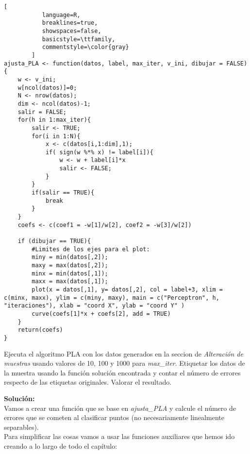 \documentclass[11pt,fleqn]{book} %
\begin{document}
\begin{lstlisting}[
           language=R,
           breaklines=true,
           showspaces=false,
           basicstyle=\ttfamily,
           commentstyle=\color{gray}
        ]
ajusta_PLA <- function(datos, label, max_iter, v_ini, dibujar = FALSE){
    w <- v_ini;
    w[ncol(datos)]=0;
    N <- nrow(datos);
    dim <- ncol(datos)-1;
    salir = FALSE;
    for(h in 1:max_iter){
        salir <- TRUE;
        for(i in 1:N){
            x <- c(datos[i,1:dim],1);
            if( sign(w %*% x) != label[i]){
                w <- w + label[i]*x
                salir <- FALSE;
            }
        }
        if(salir == TRUE){
            break
        }
    }
    coefs <- c(coef1 = -w[1]/w[2], coef2 = -w[3]/w[2])

    if (dibujar == TRUE){
        #Limites de los ejes para el plot:
        miny = min(datos[,2]);
        maxy = max(datos[,2]);
        minx = min(datos[,1]);
        maxx = max(datos[,1]);
        plot(x = datos[,1], y= datos[,2], col = label+3, xlim = c(minx, maxx), ylim = c(miny, maxy), main = c("Perceptron", h, "iteraciones"), xlab = "coord X", ylab = "coord Y" )
        curve(coefs[1]*x + coefs[2], add = TRUE)
    }
    return(coefs)
}
\end{lstlisting}
\pagebreak
\begin{exercise}
Ejecuta el algoritmo PLA con los datos generados en la seccion de \textit{Alteración de muestras} 
usando valores de 10, 100 y 1000 para \textit{max\_iter}. Etiquetar los datos de la muestra usando la función solución encontrada y contar el número de errores respecto de las etiquetas originales. Valorar el resultado.
\end{exercise}
\textbf{Solución:}\\

Vamos a crear una función que se base en \textit{ajusta\_PLA} y calcule el número de errores que se cometen al clasificar puntos (no necesariamente linealmente separables).\\
Para simplificar las cosas vamos a usar las funciones auxiliares que hemos ido creando a lo largo de todo el capítulo:\\
\end{document}

